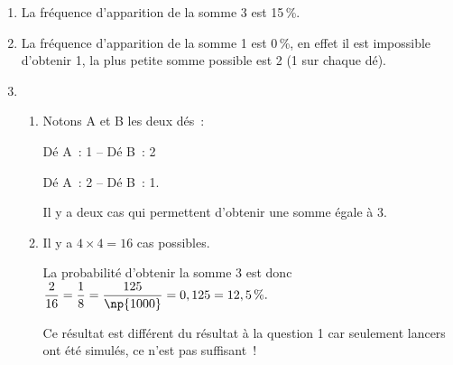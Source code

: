 
\medskip

%
%
%

\begin{enumerate}
\item %
La fréquence d'apparition de la somme 3 est 15\,\%.
\item %
La fréquence d'apparition de la somme 1 est 0\,\%, en effet il est impossible d'obtenir 1, la plus petite somme possible est 2 (1 sur chaque dé).
\item  
	\begin{enumerate}
		\item %
Notons A et B les deux dés :

Dé A : 1 – Dé B : 2

Dé A : 2 – Dé B : 1.

Il y a deux cas qui permettent d'obtenir une somme égale à 3.
		\item %
		
Il y a $4 \times 4 = 16$ cas possibles.

La probabilité d'obtenir la somme 3 est donc $\dfrac{2}{16} = \dfrac{1}{8}  = \dfrac{125}{\np{1000}} = 0,125 = 12,5\,\%.$

		Ce résultat est différent du résultat à la question 1 car seulement  lancers ont été simulés, ce n'est pas suffisant !
	\end{enumerate} 
 \end{enumerate}
 
\vspace{0,5cm}

